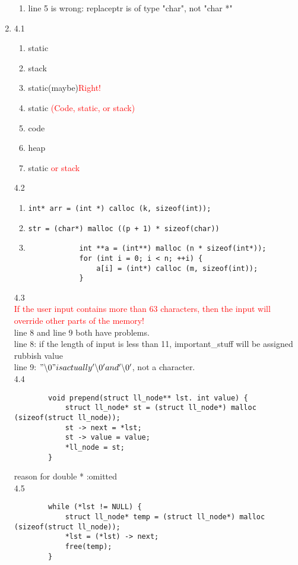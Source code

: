 \documentclass[12pt,a4paper]{article}
\begin{document}
\begin{enumerate}
\begin{enumerate}
		\item line 5 is wrong: replaceptr is of type "char", not "char *"
	\end{enumerate}
	\item 4.1\begin{enumerate}
		\item static
		\item stack
		\item static(maybe)\textcolor{red}{Right!}
		\item static \textcolor{red}{(Code, static, or stack)}
		\item code
		\item heap
		\item static \textcolor{red}{or stack}
	\end{enumerate}
	4.2\begin{enumerate}
		\item \verb|int* arr = (int *) calloc (k, sizeof(int));|
		\item \verb|str = (char*) malloc ((p + 1) * sizeof(char))|
		\item \begin{verbatim}
			int **a = (int**) malloc (n * sizeof(int*));
			for (int i = 0; i < n; ++i) {
				a[i] = (int*) calloc (m, sizeof(int));
			}
		\end{verbatim}
	\end{enumerate}
	4.3\\\textcolor{red}{If the user input contains more than 63 characters, then the input will override other
		parts of the memory! }\\line 8 and line 9 both have problems.\\
		line 8: if the length of input is less than 11, important\_stuff will be assigned rubbish value\\
		line 9: $"\backslash0" is actually '\backslash0' and '\backslash0'$, not a character.\\
	4.4 \begin{verbatim}
		void prepend(struct ll_node** lst. int value) {
			struct ll_node* st = (struct ll_node*) malloc (sizeof(struct ll_node));
			st -> next = *lst;
			st -> value = value;
			*ll_node = st;
		}
	\end{verbatim}
	reason for double * :omitted\\
	4.5 \begin{verbatim}
		while (*lst != NULL) {
			struct ll_node* temp = (struct ll_node*) malloc (sizeof(struct ll_node));
			*lst = (*lst) -> next;
			free(temp);
		}
	\end{verbatim}
\end{enumerate}
\end{document}
